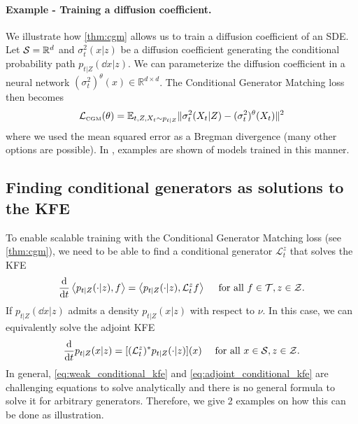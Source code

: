 \documentclass{fairmeta}
\numberwithin{equation}{section}
\begin{document}
\paragraph{Example - Training a diffusion coefficient.} We illustrate how \cref{thm:cgm} allows us to train a diffusion coefficient of an SDE. Let ${\mathcal{S}}=\mathbb{R}^d$ and $\sigma_t^2(x|z)$ be a diffusion coefficient generating the conditional probability path $p_{t|Z}(\dd x|z)$. We can parameterize the diffusion coefficient in a neural network $(\sigma_t^2)^\theta(x)\in\mathbb{R}^{d\times d}$. The Conditional Generator Matching loss then becomes
\begin{align*}
{\mathcal{L}}_{\scriptscriptstyle \text{CGM}}(\theta) = \mathbb{E}_{t,Z, X_t\sim p_{t|Z}} \|\sigma_t^2(X_t|Z)- (\sigma_t^2)^\theta(X_t)\|^2
\end{align*} 
where we used the mean squared error as a Bregman divergence (many other options are possible). In \citep{holderrieth2024gm}, examples are shown of models trained in this manner.

\subsection{Finding conditional generators as solutions to the KFE}
\label{subsec:find_cond_generators}
To enable scalable training with the Conditional Generator Matching loss (see \cref{thm:cgm}), we need to be able to find a conditional generator $\mathcal{L}_t^z$ that solves the KFE
\begin{align}
\label{eq:weak_conditional_kfe}
\frac{\mathrm{d}}{\mathrm{d} t} \left \langle p_{t|Z}(\cdot|z), f\right \rangle = \left \langle p_{t|Z}(\cdot|z), {\mathcal{L}}_t^z f\right \rangle\quad \text{ for all }f\in\mathcal{T},z\in{\mathcal{Z}}.
\end{align}
If $p_{t|Z}(\dd x|z)$ admits a density $p_{t|Z}(x|z)$ with respect to $\nu$. In this case, we can equivalently solve the adjoint KFE 
\begin{align}
\label{eq:adjoint_conditional_kfe}
\frac{\mathrm{d}}{\mathrm{d} t}  p_{t|Z}(x|z) = [(\mathcal{L}_t^z)^*p_{t|Z}(\cdot|z)](x)\quad \text{ for all }x\in{\mathcal{S}}, z\in{\mathcal{Z}}.
\end{align}
In general, \cref{eq:weak_conditional_kfe} and \cref{eq:adjoint_conditional_kfe} are challenging equations to solve analytically and there is no general formula to solve it for arbitrary generators. Therefore, we give 2 examples on how this can be done as illustration. 
\end{document}
